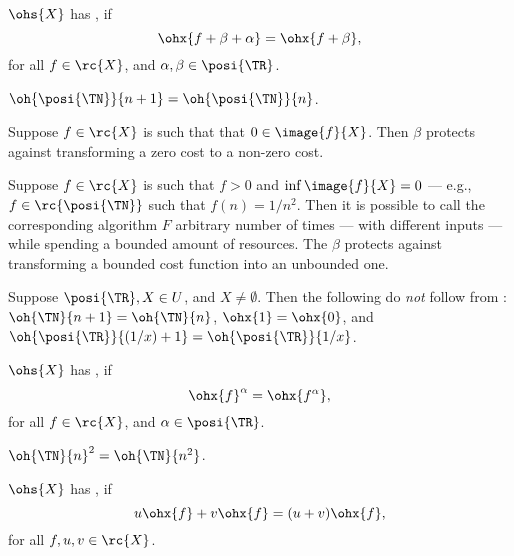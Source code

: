 \documentclass[b5paper, english, oneside]{memoir}
\begin{document}
\begin{definition}
$\ohs{X}$ has , if
\begin{equation}
\ohx{f + \beta + \alpha} = \ohx{f + \beta},
\end{equation}
for all $f \in \rc{X}$, and $\alpha, \beta \in \posi{\TR}$.
\end{definition}

\begin{example}
$\oh{\posi{\TN}}{n + 1} = \oh{\posi{\TN}}{n}$.
\end{example}

\begin{note}
Suppose $f \in \rc{X}$ is such that that $0 \in \image{f}{X}$. Then $\beta$ protects against transforming a zero cost to a non-zero cost.

Suppose $f \in \rc{X}$ is such that $f > 0$ and $\inf \image{f}{X} = 0$ --- e.g., $f \in \rc{\posi{\TN}}$ such that $f(n) = 1 / n^2$. Then it is possible to call the corresponding algorithm $F$ arbitrary number of times --- with different inputs --- while spending a bounded amount of resources. The $\beta$ protects against transforming a bounded cost function into an unbounded one.
\end{note}

\begin{example}
Suppose $ \posi{\TR}, X \in U$, and $X \neq \emptyset$. Then the following do \emph{not} follow from : $\oh{\TN}{n + 1} = \oh{\TN}{n}$, $\ohx{1} = \ohx{0}$, and $\oh{\posi{\TR}}{(1 / x) + 1} = \oh{\posi{\TR}}{1 / x}$.
\end{example}

\begin{definition}
$\ohs{X}$ has , if
\begin{equation}
\ohx{f}^{\alpha} = \ohx{f^{\alpha}},
\end{equation}
for all $f \in \rc{X}$, and $\alpha \in \posi{\TR}$.
\end{definition}

\begin{example}
$\oh{\TN}{n}^2 = \oh{\TN}{n^2}$.
\end{example}

\begin{definition}
$\ohs{X}$ has , if
\begin{equation}
u \ohx{f} + v \ohx{f} = (u + v) \ohx{f},
\end{equation}
for all $f, u, v \in \rc{X}$.
\end{definition}
\end{document}
